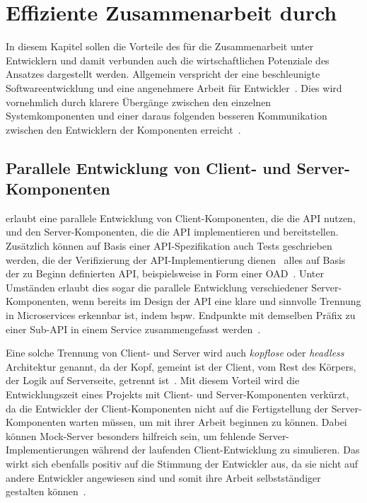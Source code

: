 \chapter{Effiziente Zusammenarbeit durch \AF}
In diesem Kapitel sollen die Vorteile des \AFAes für die Zusammenarbeit unter Entwicklern und damit verbunden auch die wirtschaftlichen Potenziale des Ansatzes dargestellt werden.
Allgemein verspricht der \AFA eine beschleunigte Softwareentwicklung und eine angenehmere Arbeit für Entwickler~\cite[354\psq]{de23}.
Dies wird vornehmlich durch klarere Übergänge zwischen den einzelnen Systemkomponenten und einer daraus folgenden besseren Kommunikation zwischen den Entwicklern der Komponenten erreicht~\cite[75]{bea22}.

\section{Parallele Entwicklung von Client- und Server-Komponenten} \label{sec:parallel-dev}
\AF erlaubt eine parallele Entwicklung von Client-Komponenten, die die \ac{API} nutzen, und den Server-Komponenten, die die \ac{API} implementieren und bereitstellen.
Zusätzlich können auf Basis einer \ac{API}-Spezifikation auch Tests geschrieben werden, die der Verifizierung der \ac{API}-Implementierung dienen \textendash\ alles auf Basis der zu Beginn definierten \ac{API}, beispielsweise in Form einer \ac{OAD}~\cite{vol22}.
Unter Umständen erlaubt dies sogar die parallele Entwicklung verschiedener Server-Komponenten, wenn bereits im Design der \ac{API} eine klare und sinnvolle Trennung in Microservices erkennbar ist, indem bspw. Endpunkte mit demselben Präfix zu einer Sub-\ac{API} in einem Service zusammengefasst werden~\cite[354]{de23}.

Eine solche Trennung von Client- und Server wird auch \emph{kopflose} oder \emph{headless} Architektur genannt, da der Kopf, gemeint ist der Client, vom Rest des Körpers, der Logik auf Serverseite, getrennt ist~\cite[5]{kul23}.
Mit diesem Vorteil wird die Entwicklungszeit eines Projekts mit Client- und Server-Komponenten verkürzt, da die Entwickler der Client-Komponenten nicht auf die Fertigstellung der Server-Komponenten warten müssen, um mit ihrer Arbeit beginnen zu können.
Dabei können Mock-Server besonders hilfreich sein, um fehlende Server-Implementierungen während der laufenden Client-Entwicklung zu simulieren.
Das wirkt sich ebenfalls positiv auf die Stimmung der Entwickler aus, da sie nicht auf andere Entwickler angewiesen sind und somit ihre Arbeit selbstständiger gestalten können~\cite[351]{de23}.

